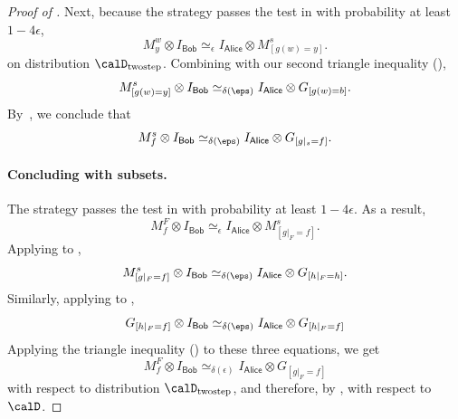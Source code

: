 \documentclass[11pt]{article}
\newcommand{\consistency}{\simeq}
\newcommand{\reg}[1]{{\mathsf{#1}}}
\begin{document}
\begin{proof}[Proof of ]
Next, because the strategy passes the test in  with probability at least $1-4\epsilon$,
\begin{equation}\label{eq:watch-out-for-the-triangle}
M^{w}_y \otimes I_{\reg{Bob}} \consistency_{\epsilon} I_{\reg{Alice}} \otimes M^s_{[g(w) = y]}.
\end{equation}
on distribution $\calD_{\mathrm{twostep}}$.
Combining  with our second triangle inequality (),
\begin{equation*}
M^s_{[g(w) = y]} \otimes I_{\reg{Bob}}
\consistency_{\delta(\eps)} I_{\reg{Alice}} \otimes G_{[g(w) = b]}.
\end{equation*}
By~, we conclude that
\begin{equation}\label{eq:finished-with-subspaces}
M^s_{f} \otimes I_{\reg{Bob}}
\consistency_{\delta(\eps)} I_{\reg{Alice}} \otimes G_{[g|_s = f]}.
\end{equation}

\paragraph{Concluding with subsets.}
The strategy passes the test in  with probability at least $1-4\epsilon$. As a result,
\begin{equation*}
M^F_f \otimes I_{\reg{Bob}}
\consistency_{\epsilon}
I_{\reg{Alice}} \otimes M^s_{[g|_F = f]}.
\end{equation*}
Applying  to ,
\begin{equation*}
M^s_{[g|_F=f]} \otimes I_{\reg{Bob}}
\consistency_{\delta(\eps)} I_{\reg{Alice}} \otimes G_{[h|_F = h]}.
\end{equation*}
Similarly, applying  to ,
\begin{equation*}
G_{[h|_F = f]} \otimes I_{\reg{Bob}} \consistency_{\delta(\eps)} I_{\reg{Alice}} \otimes G_{[h|_F=f]}
\end{equation*}
Applying the triangle inequality () to these three equations,
we get
\begin{equation*}
M^F_f \otimes I_{\reg{Bob}}
\consistency_{\delta(\epsilon)}
I_{\reg{Alice}} \otimes G_{[g|_{F} = f]}
\end{equation*}
with respect to distribution $\calD_{\mathrm{twostep}}$,
and therefore, by , with respect to $\calD$.
\end{proof}
\end{document}
